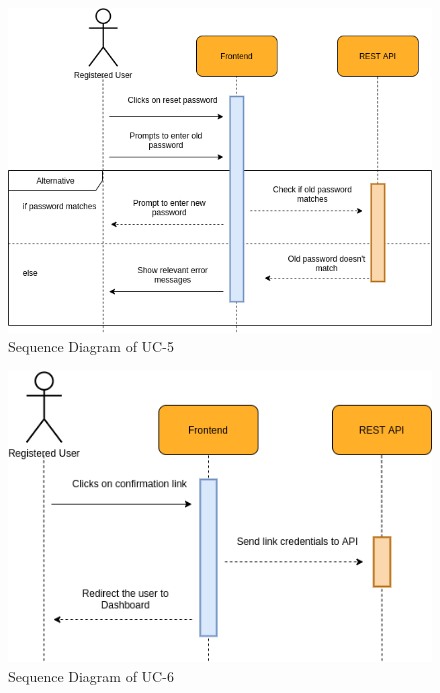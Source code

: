         \begin{figure}[H]
            \centering
            \includegraphics[scale=0.5]{./diagrams/sequence/seq-05.png}
            \caption{Sequence Diagram of UC-5}
            \label{fig:seq-05}
            
        \end{figure}
    

        \begin{figure}[H]
            \centering
            \includegraphics[scale=0.5]{./diagrams/sequence/seq-06.png}
            \caption{Sequence Diagram of UC-6}
            \label{fig:seq-06}
            
        \end{figure}
    

